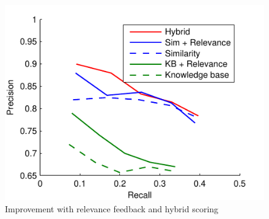 \documentclass{acm_proc_article-sp}
\begin{document}
\begin{figure}
\includegraphics{expt_relevance}
\caption{Improvement with relevance feedback and hybrid scoring}
\label{fig-expt-relevance}
\end{figure}



\end{document}
